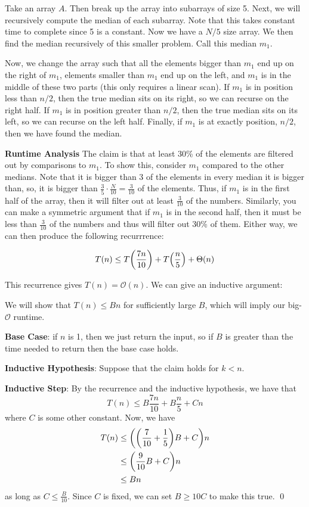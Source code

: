 \begin{algothm} 
    Take an array $A$. Then break up the array into subarrays of size 5.
    Next, we will recursively compute the median of each subarray. Note that this takes constant
    time to complete since 5 is a constant. Now we have a $N / 5$ size array. We then find the median recursively of this smaller problem.
    Call this median $m_1$.

    Now, we change the array such that all the elements bigger than $m_1$ end up on the right of $m_1$,
    elements smaller than $m_1$ end up on the left, and $m_1$ is in the middle of these two parts (this only requires a linear scan).
    If $m_1$ is in position
    less than $n / 2$, then the true median sits on its right, so we can recurse on the right half.
    If $m_1$ is in position greater than $n / 2$, then the true median sits on its left, so we can recurse on the left half.
    Finally, if $m_1$ is at exactly position, $n/2$, then we have found the median.

    \textbf{Runtime Analysis}
    The claim is that at least 30\% of the elements are filtered out by comparisons to $m_1$. To show this,
    consider $m_1$ compared to the other medians. Note that it is bigger than 3 of the elements in every median it is bigger than,
    so, it is bigger than $\frac{3}{5} \cdot \frac{N}{10} = \frac{3}{10}$ of the elements. Thus, if $m_1$ is in the first half of the array,
    then it will filter out at least $\frac{3}{10}$ of the numbers. Similarly, you can make a symmetric argument that if $m_1$ is in the second half,
    then it must be less than $\frac{3}{10}$ of the numbers and thus will filter out 30\% of them. Either way, we can then produce the following recurrrence:

    \[ T(n) \leq T\qty(\frac{7n}{10}) + T\qty(\frac{n}{5}) + \Theta(n) \]

    This recurrence gives $T(n) = \mathcal{O}(n)$. We can give an inductive argument:
    \begin{proof*}
        We will show that $T(n) \leq Bn$ for sufficiently large $B$, which will imply our big-$\mathcal{O}$ runtime.

        \textbf{Base Case}: if $n$ is 1, then we just return the input, so if $B$ is greater than the time needed to return
        then the base case holds.

        \textbf{Inductive Hypothesis}: Suppose that the claim holds for $k < n$.
        
        \textbf{Inductive Step}: By the recurrence and the inductive hypothesis, we have that
        \[T(n) \leq B \frac{7n}{10} + B \frac{n}{5} + Cn\]
        where $C$ is some other constant. Now, we have
        \begin{align*}
            T(n) &\leq \qty(\qty(\frac{7}{10} + \frac{1}{5})B + C)n \\
            &\leq \qty(\frac{9}{10}B + C)n \\
            &\leq Bn
        \end{align*}
        as long as $C \leq \frac{B}{10}$. Since $C$ is fixed, we can
        set $B \geq 10C$ to make this true. \qed
    \end{proof*}

\end{algothm}

